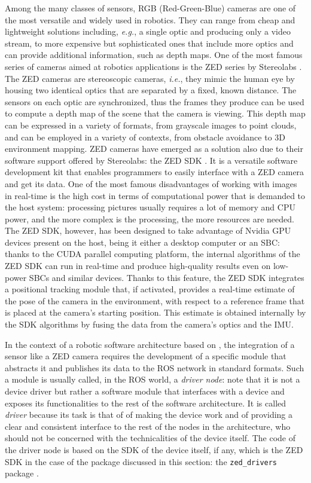 Among the many classes of sensors, RGB (Red-Green-Blue) cameras are one of the most versatile and widely used in robotics. They can range from cheap and lightweight solutions including, \emph{e.g.}, a single optic and producing only a video stream, to more expensive but sophisticated ones that include more optics and can provide additional information, such as depth maps. One of the most famous series of cameras aimed at robotics applications is the ZED series by Stereolabs \cite{stereolabs_stereolabs_nodate}. The ZED cameras are stereoscopic cameras, \emph{i.e.}, they mimic the human eye by housing two identical optics that are separated by a fixed, known distance. The sensors on each optic are synchronized, thus the frames they produce can be used to compute a depth map of the scene that the camera is viewing. This depth map can be expressed in a variety of formats, from grayscale images to point clouds, and can be employed in a variety of contexts, from obstacle avoidance to 3D environment mapping. ZED cameras have emerged as a solution also due to their software support offered by Stereolabs: the ZED SDK \cite{stereolabs_zed_nodate}. It is a versatile software development kit that enables programmers to easily interface with a ZED camera and get its data. One of the most famous disadvantages of working with images in real-time is the high cost in terms of computational power that is demanded to the host system: processing pictures usually requires a lot of memory and CPU power, and the more complex is the processing, the more resources are needed. The ZED SDK, however, has been designed to take advantage of Nvidia GPU devices present on the host, being it either a desktop computer or an SBC: thanks to the CUDA parallel computing platform, the internal algorithms of the ZED SDK can run in real-time and produce high-quality results even on low-power SBCs and similar devices. Thanks to this feature, the ZED SDK integrates a positional tracking module that, if activated, provides a real-time estimate of the pose of the camera in the environment, with respect to a reference frame that is placed at the camera's starting position. This estimate is obtained internally by the SDK algorithms by fusing the data from the camera's optics and the IMU.

In the context of a robotic software architecture based on \ROS, the integration of a sensor like a ZED camera requires the development of a specific module that abstracts it and publishes its data to the ROS network in standard formats. Such a module is usually called, in the ROS world, a \emph{driver node}: note that it is not a device driver but rather a software module that interfaces with a device and exposes its functionalities to the rest of the software architecture. It is called \emph{driver} because its task is that of of making the device work and of providing a clear and consistent interface to the rest of the nodes in the architecture, who should not be concerned with the technicalities of the device itself. The code of the driver node is based on the SDK of the device itself, if any, which is the ZED SDK in the case of the package discussed in this section: the \texttt{zed\_drivers} package \cite{masocco_zed_drivers_nodate}.

